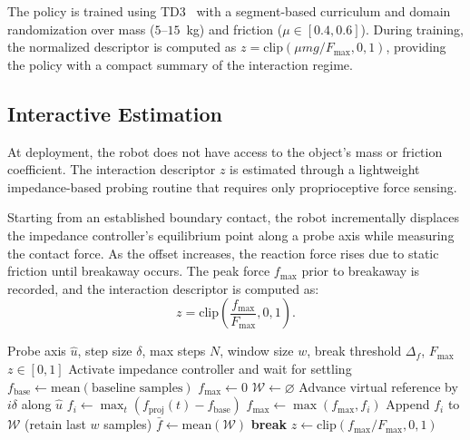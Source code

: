 The policy is trained using TD3~\citep{fujimoto2018td3} with a segment-based curriculum and domain randomization over mass ($5$--$15$~kg) and friction ($\mu \in [0.4, 0.6]$). During training, the normalized descriptor is computed as $z = \text{clip}(\mu m g / F_\text{max}, 0, 1)$, providing the policy with a compact summary of the interaction regime.


\subsection{Interactive Estimation}
\label{sec:pho_estimation}

At deployment, the robot does not have access to the object's mass or friction coefficient. The interaction descriptor $z$ is estimated through a lightweight impedance-based probing routine that requires only proprioceptive force sensing.

Starting from an established boundary contact, the robot incrementally displaces the impedance controller's equilibrium point along a probe axis while measuring the contact force. As the offset increases, the reaction force rises due to static friction until breakaway occurs. The peak force $f_\text{max}$ prior to breakaway is recorded, and the interaction descriptor is computed as:
\[
z = \text{clip}\left(\frac{f_\text{max}}{F_\text{max}}, 0, 1\right).
\]

\begin{algorithm}[t]
\vspace*{0.2cm}
\footnotesize
\caption{\footnotesize Reactive Force Estimation via Impedance Probing}
\label{alg:force_probe}
\begin{algorithmic}[1]
\REQUIRE Probe axis $\hat{u}$, step size $\delta$, max steps $N$, window size $w$, break threshold $\Delta_f$, $F_{\max}$
\ENSURE $z \in [0,1]$
\STATE Activate impedance controller and wait for settling
\STATE $f_{\text{base}} \gets \mathrm{mean}(\text{baseline samples})$
\STATE $f_{\max} \gets 0$
\STATE $\mathcal{W} \gets \varnothing$
    \STATE Advance virtual reference by $i\delta$ along $\hat{u}$
    \STATE $f_i \gets \max_t (f_{\text{proj}}(t) - f_{\text{base}})$
    \STATE $f_{\max} \gets \max(f_{\max}, f_i)$
    \STATE Append $f_i$ to $\mathcal{W}$ (retain last $w$ samples)
        \STATE $\bar{f} \gets \mathrm{mean}(\mathcal{W})$
            \STATE \textbf{break} 
        \ENDIF
    \ENDIF
\ENDFOR
\STATE \RETURN $z \gets \mathrm{clip}(f_{\max}/F_{\max}, 0, 1)$
\end{algorithmic}
\end{algorithm}

